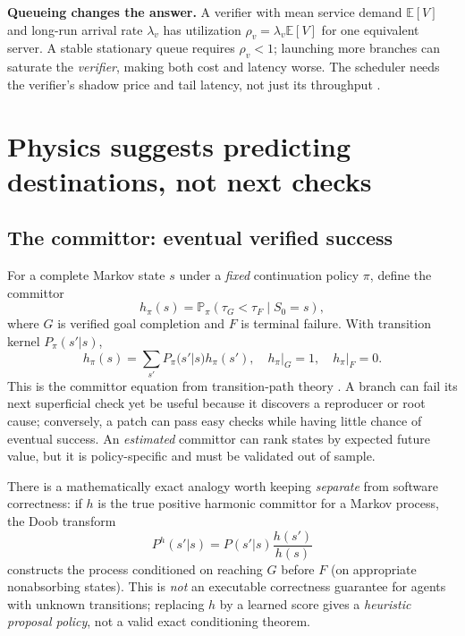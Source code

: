 \documentclass[10pt,twocolumn]{article}
\newcommand{\Pp}{\mathbb P}
\newcommand{\Ee}{\mathbb E}
\newcommand{\claim}[1]{\textbf{\color{accent}#1}}
\begin{document}
\claim{Queueing changes the answer.} A verifier with mean service demand $\Ee[V]$ and long-run arrival rate $\lambda_v$ has utilization $\rho_v=\lambda_v\Ee[V]$ for one equivalent server. A stable stationary queue requires $\rho_v<1$; launching more branches can saturate the \emph{verifier}, making both cost and latency worse. The scheduler needs the verifier's shadow price and tail latency, not just its throughput \cite{tail}.

\section{Physics suggests predicting destinations, not next checks}

\subsection{The committor: eventual verified success}
For a complete Markov state $s$ under a \emph{fixed} continuation policy $\pi$, define the committor
\begin{equation}\label{eq:committor}
h_\pi(s)=\Pp_\pi(\tau_G<\tau_F\mid S_0=s),
\end{equation}
where $G$ is verified goal completion and $F$ is terminal failure. With transition kernel $P_\pi(s'|s)$,
\begin{equation}\label{eq:harmonic}
 h_\pi(s)=\sum_{s'}P_\pi(s'|s)h_\pi(s'),
 \quad h_\pi|_G=1,\quad h_\pi|_F=0.
\end{equation}
This is the committor equation from transition-path theory \cite{tpt}. A branch can fail its next superficial check yet be useful because it discovers a reproducer or root cause; conversely, a patch can pass easy checks while having little chance of eventual success. An \emph{estimated} committor can rank states by expected future value, but it is policy-specific and must be validated out of sample.

There is a mathematically exact analogy worth keeping \emph{separate} from software correctness: if $h$ is the true positive harmonic committor for a Markov process, the Doob transform
\begin{equation}\label{eq:doob}
P^h(s'|s)=P(s'|s)\frac{h(s')}{h(s)}
\end{equation}
constructs the process conditioned on reaching $G$ before $F$ (on appropriate nonabsorbing states). This is \emph{not} an executable correctness guarantee for agents with unknown transitions; replacing $h$ by a learned score gives a \emph{heuristic proposal policy}, not a valid exact conditioning theorem.
\end{document}
